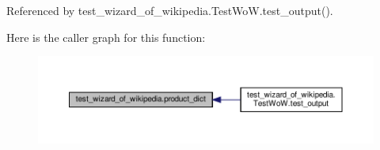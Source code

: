 Referenced by test\+\_\+wizard\+\_\+of\+\_\+wikipedia.\+Test\+Wo\+W.\+test\+\_\+output().

Here is the caller graph for this function\+:
\nopagebreak
\begin{figure}[H]
\begin{center}
\leavevmode
\includegraphics[width=350pt]{namespacetest__wizard__of__wikipedia_a164c55752f617c13303f14f70ac90b0c_icgraph}
\end{center}
\end{figure}
